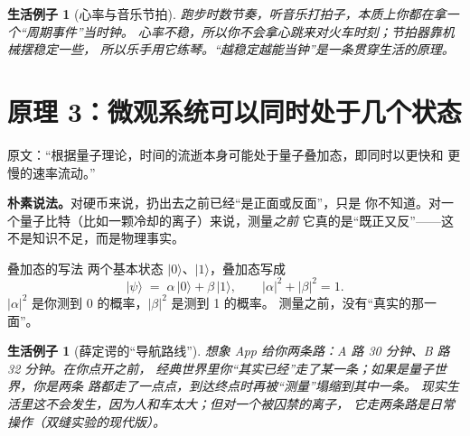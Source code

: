 \documentclass[11pt,a4paper]{ctexart}
\newtheorem{example}[principle]{生活例子}
\begin{document}
\begin{example}[心率与音乐节拍]
跑步时数节奏，听音乐打拍子，本质上你都在拿一个``周期事件''当时钟。
心率不稳，所以你不会拿心跳来对火车时刻；节拍器靠机械摆稳定一些，
所以乐手用它练琴。``越稳定越能当钟''是一条贯穿生活的原理。
\end{example}

\section{原理 3：微观系统可以同时处于几个状态}

\begin{newsblock}
原文：``根据量子理论，时间的流逝本身可能处于量子叠加态，即同时以更快和
更慢的速率流动。''
\end{newsblock}

\begin{intuitionblock}
\textbf{朴素说法。}对硬币来说，扔出去之前已经``是正面或反面''，只是
你不知道。对一个量子比特（比如一颗冷却的离子）来说，测量\emph{之前}
它真的是``既正又反''——这不是知识不足，而是物理事实。
\end{intuitionblock}

\begin{mathblock}{叠加态的写法}
两个基本状态 $\lvert 0\rangle$、$\lvert 1\rangle$，叠加态写成
\[
  \lvert\psi\rangle \;=\; \alpha\,\lvert 0\rangle + \beta\,\lvert 1\rangle,
  \qquad |\alpha|^2 + |\beta|^2 = 1.
\]
$|\alpha|^2$ 是你测到 0 的概率，$|\beta|^2$ 是测到 1 的概率。
测量之前，没有``真实的那一面''。
\end{mathblock}

\begin{center}
\end{center}

\begin{example}[薛定谔的``导航路线'']
想象 App 给你两条路：A 路 30 分钟、B 路 32 分钟。在你点开之前，
经典世界里你``其实已经''走了某一条；如果是量子世界，你是\emph{两条
路都走了一点点}，到达终点时再被``测量''塌缩到其中一条。
现实生活里这不会发生，因为人和车太大；但对一个被囚禁的离子，
它走两条路是日常操作（双缝实验的现代版）。
\end{example}
\end{document}
